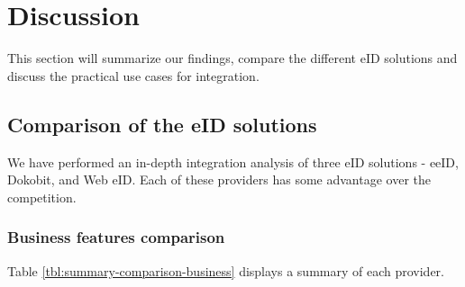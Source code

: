 \section{Discussion}

This section will summarize our findings, compare the different eID solutions and discuss the practical use cases for integration.

\subsection{Comparison of the eID solutions}

We have performed an in-depth integration analysis of three eID solutions - eeID, Dokobit, and Web eID. Each of these providers has some advantage over the competition.

\subsubsection{Business features comparison}

Table \ref{tbl:summary-comparison-business} displays a summary of each provider.

